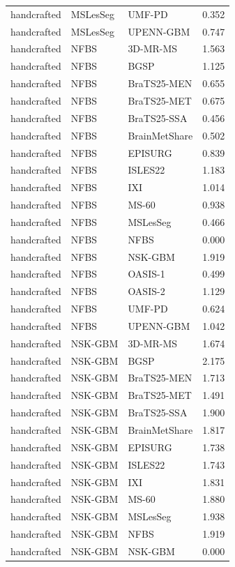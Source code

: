 \begin{tabular}{lllr}
handcrafted & MSLesSeg & UMF-PD & 0.352 \\
handcrafted & MSLesSeg & UPENN-GBM & 0.747 \\
handcrafted & NFBS & 3D-MR-MS & 1.563 \\
handcrafted & NFBS & BGSP & 1.125 \\
handcrafted & NFBS & BraTS25-MEN & 0.655 \\
handcrafted & NFBS & BraTS25-MET & 0.675 \\
handcrafted & NFBS & BraTS25-SSA & 0.456 \\
handcrafted & NFBS & BrainMetShare & 0.502 \\
handcrafted & NFBS & EPISURG & 0.839 \\
handcrafted & NFBS & ISLES22 & 1.183 \\
handcrafted & NFBS & IXI & 1.014 \\
handcrafted & NFBS & MS-60 & 0.938 \\
handcrafted & NFBS & MSLesSeg & 0.466 \\
handcrafted & NFBS & NFBS & 0.000 \\
handcrafted & NFBS & NSK-GBM & 1.919 \\
handcrafted & NFBS & OASIS-1 & 0.499 \\
handcrafted & NFBS & OASIS-2 & 1.129 \\
handcrafted & NFBS & UMF-PD & 0.624 \\
handcrafted & NFBS & UPENN-GBM & 1.042 \\
handcrafted & NSK-GBM & 3D-MR-MS & 1.674 \\
handcrafted & NSK-GBM & BGSP & 2.175 \\
handcrafted & NSK-GBM & BraTS25-MEN & 1.713 \\
handcrafted & NSK-GBM & BraTS25-MET & 1.491 \\
handcrafted & NSK-GBM & BraTS25-SSA & 1.900 \\
handcrafted & NSK-GBM & BrainMetShare & 1.817 \\
handcrafted & NSK-GBM & EPISURG & 1.738 \\
handcrafted & NSK-GBM & ISLES22 & 1.743 \\
handcrafted & NSK-GBM & IXI & 1.831 \\
handcrafted & NSK-GBM & MS-60 & 1.880 \\
handcrafted & NSK-GBM & MSLesSeg & 1.938 \\
handcrafted & NSK-GBM & NFBS & 1.919 \\
handcrafted & NSK-GBM & NSK-GBM & 0.000 \\

\end{tabular}
